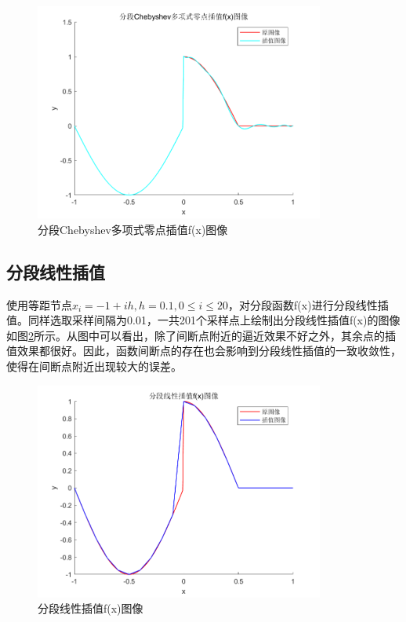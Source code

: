 \documentclass[a4paper]{article}
\begin{document}
\begin{figure}[!h]
	\centering
	\includegraphics[width=0.85\textwidth]{../code/result/lagchef1}
	\caption{\label{2fig:3}分段Chebyshev多项式零点插值f(x)图像}
\end{figure}

\subsection{分段线性插值}
使用等距节点$x_i=-1+ih,h=0.1,0\le i\le 20$，对分段函数f(x)进行分段线性插值。同样选取采样间隔为0.01，一共201个采样点上绘制出分段线性插值f(x)的图像如图\ref{2fig:4}所示。从图中可以看出，除了间断点附近的逼近效果不好之外，其余点的插值效果都很好。因此，函数间断点的存在也会影响到分段线性插值的一致收敛性，使得在间断点附近出现较大的误差。
\begin{figure}[!h]
	\centering
	\includegraphics[width=0.85\textwidth]{../code/result/linf}
	\caption{\label{2fig:4}分段线性插值f(x)图像}
\end{figure}
\end{document}
